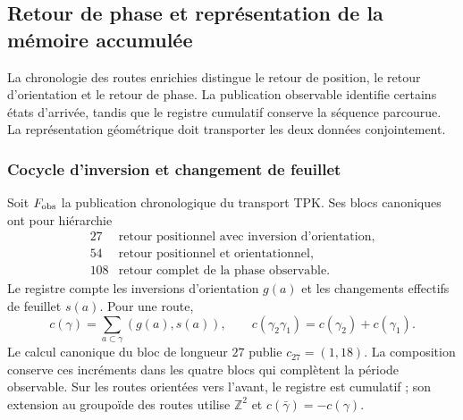 
\subsection{Retour de phase et représentation de la mémoire accumulée}
\label{ii:vii:sec:retorno-memoria-gravedad}

La chronologie des routes enrichies distingue le retour de position,
le retour d'orientation et le retour de phase. La publication observable
identifie certains états d'arrivée, tandis que le registre cumulatif
conserve la séquence parcourue. La représentation géométrique doit
transporter les deux données conjointement.

\subsubsection{Cocycle d'inversion et changement de feuillet}
\label{ii:vii:subsec:cociclo-memoria}

Soit \(F_{\rm obs}\) la publication chronologique du transport TPK.
Ses blocs canoniques ont pour hiérarchie
\[
\begin{array}{c|l}
27&\text{retour positionnel avec inversion d'orientation},\\
54&\text{retour positionnel et orientationnel},\\
108&\text{retour complet de la phase observable}.
\end{array}
\]
Le registre compte les inversions d'orientation \(g(a)\) et les
changements effectifs de feuillet \(s(a)\). Pour une route,
\begin{equation}
 c(\gamma)=\sum_{a\subset\gamma}(g(a),s(a)),\qquad
 c(\gamma_2\gamma_1)=c(\gamma_2)+c(\gamma_1).
 \label{ii:vii:eq:cociclo-ruta}
\end{equation}
Le calcul canonique du bloc de longueur \(27\) publie
\(c_{27}=(1,18)\). La composition conserve ces incréments dans
les quatre blocs qui complètent la période observable.
Sur les routes orientées vers l'avant, le registre est cumulatif ;
son extension au groupoïde des routes utilise \(\mathbb Z^2\) et
\(c(\bar\gamma)=-c(\gamma)\).

